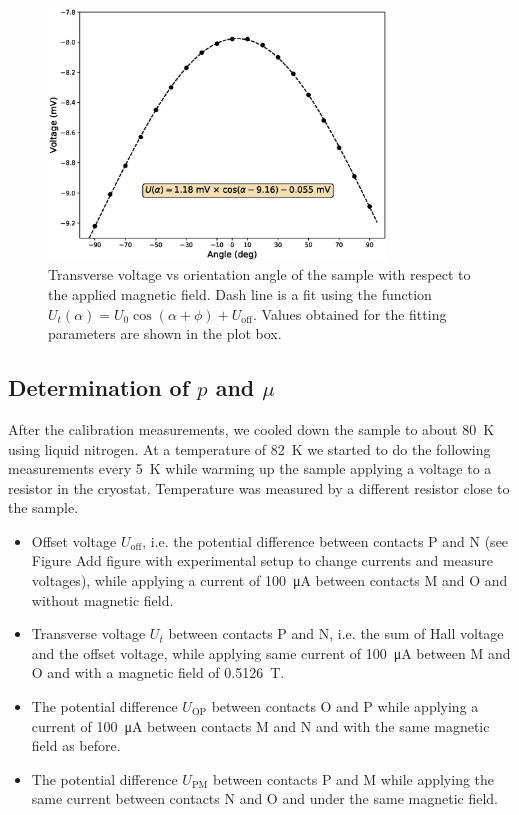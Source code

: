 \documentclass[11pt,a4paper]{article}
\begin{document}
\begin{figure}[H]
\centering
\includegraphics[width=0.8\textwidth]{Voltage_vs_angle.eps}
\caption{Transverse voltage vs orientation angle of the sample with respect to the applied magnetic field. Dash line is a fit using the function $U_t(\alpha)=U_0\cos(\alpha+\phi) + U_\text{off}$. Values obtained for the fitting parameters are shown in the plot box.}
\label{fig:orientation}
\end{figure}

\subsection{Determination of $p$ and $\mu$}

After the calibration measurements, we cooled down the sample to about \SI{80}{\kelvin} using liquid nitrogen. At a temperature of \SI{82}{\kelvin} we started to do the following measurements every \SI{5}{\kelvin} while warming up the sample applying a voltage to a resistor in the cryostat. Temperature was measured by a different resistor close to the sample.
\begin{itemize}
\item Offset voltage $U_\text{off}$, i.e. the potential difference between contacts P and N (see Figure {\color{red}Add figure with experimental setup to change currents and measure voltages}), while applying a current of \SI{100}{\micro\ampere} between contacts M and O and without magnetic field.
\item Transverse voltage $U_t$ between contacts P and N, i.e. the sum of Hall voltage and the offset voltage, while applying same current of \SI{100}{\micro\ampere} between M and O and with a magnetic field of \SI{0.5126}{\tesla}.
\item The potential difference $U_\text{OP}$ between contacts O and P while applying a current of \SI{100}{\micro\ampere} between contacts M and N and with the same magnetic field as before.
\item The potential difference $U_\text{PM}$ between contacts P and M while applying the same current between contacts N and O and under the same magnetic field.
\end{itemize}
\end{document}
